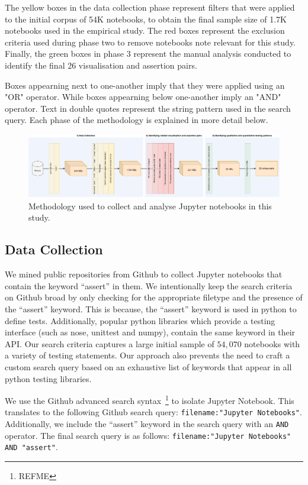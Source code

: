 \documentclass[conference]{IEEEtran}
\begin{document}
The yellow boxes in the data collection phase represent filters that
were applied to the initial corpus of 54K notebooks, to obtain the
final sample size of 1.7K notebooks used in the empirical study. The
red boxes represent the exclusion criteria used during phase two to
remove notebooks note relevant for this study. Finally, the green
boxes in phase 3 represent the manual analysis conducted to identify
the final 26 visualisation and assertion pairs.

Boxes appearning next to one-another imply that they were applied
using an "OR" operator. While boxes appearning below one-another imply
an "AND" operator. Text in double quotes represent the string pattern
used in the search query. Each phase of the methodology is explained
in more detail below.

\begin{figure}
  \centering
  \includegraphics[width=\textwidth]{method.pdf}
  \caption{Methodology used to collect and analyse Jupyter notebooks
    in this study.}
  \label{fig:method}
\end{figure}

\subsection{Data Collection}\label{sec:data-collect}

We mined public repositories from Github to collect Jupyter notebooks
that contain the keyword ``assert'' in them. We intentionally keep the
search criteria on Github broad by only checking for the appropriate
filetype and the presence of the ``assert'' keyword. This is because,
the ``assert'' keyword is used in python to define
tests. Additionally, popular python libraries which provide a testing
interface (such as nose, unittest and numpy), contain the same keyword
in their API. Our search criteria captures a large initial sample of
$54,070$ notebooks with a variety of testing statements. Our approach
also prevents the need to craft a custom search query based on an
exhaustive list of keywords that appear in all python testing
libraries.

We use the Github advanced search syntax~\footnote{REFME} to isolate
Jupyter Notebook. This translates to the following Github search
query: \texttt{filename:"Jupyter Notebooks"}. Additionally, we include
the ``assert'' keyword in the search query with an \texttt{AND}
operator. The final search query is as follows:
\texttt{filename:"Jupyter Notebooks" AND "assert"}.
\end{document}

